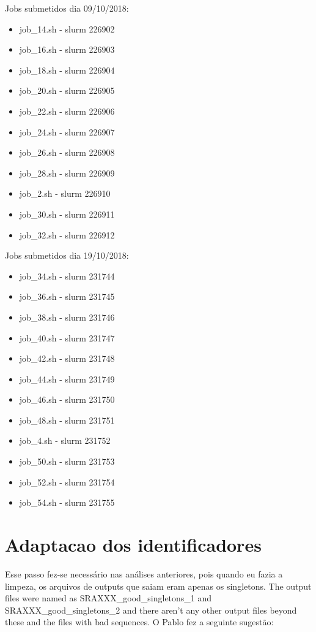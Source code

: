 \documentclass[12pt, a4paper]{report}
\begin{document}
Jobs submetidos dia 09/10/2018:
\begin{itemize}
\item job\_14.sh - slurm 226902
\item job\_16.sh - slurm 226903
\item job\_18.sh - slurm 226904
\item job\_20.sh - slurm 226905
\item job\_22.sh - slurm 226906
\item job\_24.sh - slurm 226907
\item job\_26.sh - slurm 226908
\item job\_28.sh - slurm 226909
\item job\_2.sh - slurm 226910
\item job\_30.sh - slurm 226911
\item job\_32.sh - slurm 226912
\end{itemize}

Jobs submetidos dia 19/10/2018:
\begin{itemize}
\item job\_34.sh - slurm 231744
\item job\_36.sh - slurm 231745
\item job\_38.sh - slurm 231746
\item job\_40.sh - slurm 231747
\item job\_42.sh - slurm 231748
\item job\_44.sh - slurm 231749
\item job\_46.sh - slurm 231750
\item job\_48.sh - slurm 231751
\item job\_4.sh - slurm 231752
\item job\_50.sh - slurm 231753
\item job\_52.sh - slurm 231754
\item job\_54.sh - slurm 231755
\end{itemize}

\chapter{Adaptacao dos identificadores}

Esse passo fez-se necessário nas análises anteriores, pois quando eu fazia a limpeza, os arquivos de outputs que saiam eram apenas os singletons. 
The output files were named as SRAXXX\_good\_singletons\_1 and SRAXXX\_good\_singletons\_2 and there aren’t any other output files beyond these and the files with bad sequences. 
O Pablo fez a seguinte sugestão:
\end{document}
